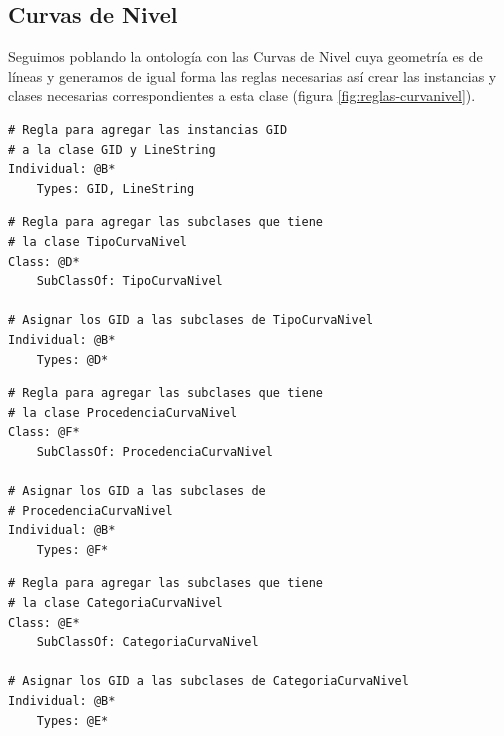 \subsection{Curvas de Nivel}

Seguimos poblando la ontología con las Curvas de Nivel cuya geometría es de líneas y generamos de igual forma las reglas necesarias así crear las instancias y clases necesarias correspondientes a esta clase (figura \ref{fig:reglas-curvanivel}).

\vspace*{0.2cm}
\begin{lstlisting}
# Regla para agregar las instancias GID 
# a la clase GID y LineString
Individual: @B*
	Types: GID, LineString
\end{lstlisting}



\begin{lstlisting}
# Regla para agregar las subclases que tiene 
# la clase TipoCurvaNivel 
Class: @D*
	SubClassOf: TipoCurvaNivel

# Asignar los GID a las subclases de TipoCurvaNivel
Individual: @B*
	Types: @D*
\end{lstlisting}




\begin{lstlisting}
# Regla para agregar las subclases que tiene 
# la clase ProcedenciaCurvaNivel 
Class: @F*
	SubClassOf: ProcedenciaCurvaNivel

# Asignar los GID a las subclases de 
# ProcedenciaCurvaNivel
Individual: @B*
	Types: @F*
\end{lstlisting}





\begin{lstlisting}
# Regla para agregar las subclases que tiene 
# la clase CategoriaCurvaNivel 
Class: @E*
	SubClassOf: CategoriaCurvaNivel

# Asignar los GID a las subclases de CategoriaCurvaNivel
Individual: @B*
	Types: @E*
\end{lstlisting}

